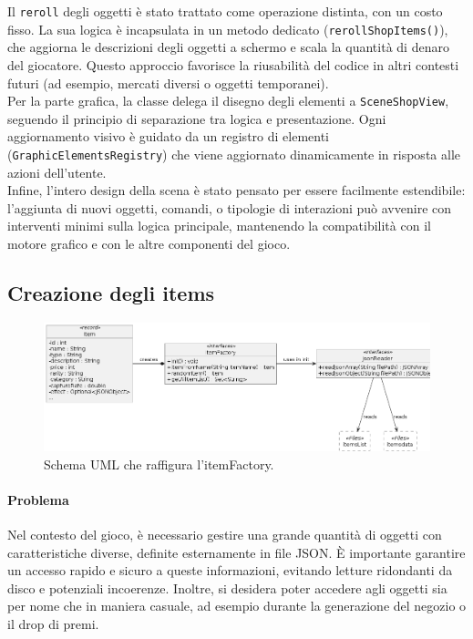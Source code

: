 \documentclass[a4paper,12pt]{report}
\begin{document}
{{Il \texttt{reroll} degli oggetti è stato trattato come operazione distinta, con un costo fisso. La sua logica è incapsulata in un metodo dedicato (\texttt{rerollShopItems()}), che aggiorna le descrizioni degli oggetti a schermo e scala la quantità di denaro del giocatore. Questo approccio favorisce la riusabilità del codice in altri contesti futuri (ad esempio, mercati diversi o oggetti temporanei).\\
Per la parte grafica, la classe delega il disegno degli elementi a \texttt{SceneShopView}, seguendo il principio di separazione tra logica e presentazione. Ogni aggiornamento visivo è guidato da un registro di elementi (\texttt{GraphicElementsRegistry}) che viene aggiornato dinamicamente in risposta alle azioni dell’utente.\\
Infine, l’intero design della scena è stato pensato per essere facilmente estendibile: l’aggiunta di nuovi oggetti, comandi, o tipologie di interazioni può avvenire con interventi minimi sulla logica principale, mantenendo la compatibilità con il motore grafico e con le altre componenti del gioco.

\subsection*{Creazione degli items}

\begin{figure}[H]
\centering{}
\includegraphics[width=\textwidth]{immagini/itemFactoryUml.png}
\caption{Schema UML che raffigura l'itemFactory. }
\label{immagini/MenuLoadBoxuml.png}
\end{figure}

\paragraph{Problema}
Nel contesto del gioco, è necessario gestire una grande quantità di oggetti con caratteristiche diverse, definite esternamente in file JSON. È importante garantire un accesso rapido e sicuro a queste informazioni, evitando letture ridondanti da disco e potenziali incoerenze. Inoltre, si desidera poter accedere agli oggetti sia per nome che in maniera casuale, ad esempio durante la generazione del negozio o il drop di premi.

}}
\end{document}
